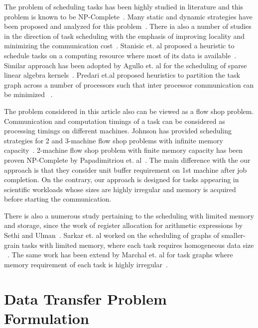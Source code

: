 \documentclass[sigconf]{acmart}
\begin{document}
	
	The problem of scheduling tasks has been highly studied in literature and this problem is known to be NP-Complete~\cite{GareyJohnson}.  Many static and dynamic strategies have been proposed and analyzed for this problem~\cite{heft-Topcuoglu,hipc16multiresource,ipdps16starpu}. There ia also a number of studies in the direction of task scheduling with the emphasis of improving locality and minimizing the communication cost~\cite{starpu,heft-Topcuoglu}. Stanisic et. al proposed a heuristic to schedule tasks on a computing resource where most of its data is available~\cite{luka-dmdar}. Similar approach has been adopted by Agullo et. al for the scheduling of sparse linear algebra kernels~\cite{agullo_fmm}.  Predari et.al  proposed  heuristics to  partition the task graph across a number of processors such that inter processor communication can be minimized ~\cite{predari:tel-01518956}.
	
	The problem considered in this article also can be viewed as a flow shop problem. Communication and computation timings of a task can be considered as processing timings on different machines.  Johnson has provided scheduling strategies for 2 and 3-machine flow shop problems with infinite memory capacity~\cite{johnson}. 2-machine flow shop problem with finite memory capacity has been proven NP-Complete by Papadimitriou et. al~\cite{Papadimitriou:1980:FSL:322203.322213}. The main difference with the our approach is that they consider unit buffer requirement on 1st machine after job completion. On the contrary, our approach is designed for tasks appearing in scientific workloads whose sizes are highly irregular and memory is acquired before starting the communication.
	
	There is also a numerous study pertaining to the scheduling with limited memory and storage, since the work of register allocation for arithmetic expressions by Sethi and Ulman~\cite{Sethi:1970:GOC:321607.321620}.  Sarkar et. al  worked on the scheduling of graphs of smaller-grain tasks with limited memory, where each task requires homogeneous data size ~\cite{vsarkar-pact}. The same work has been extend by Marchal et. al for task graphs where memory requirement of each task is highly irregular~\cite{loris-ipdps18}.
	
	
	
	\section{Data Transfer Problem Formulation}
	\label{sec:theoreticalProof}
	
\end{document}
